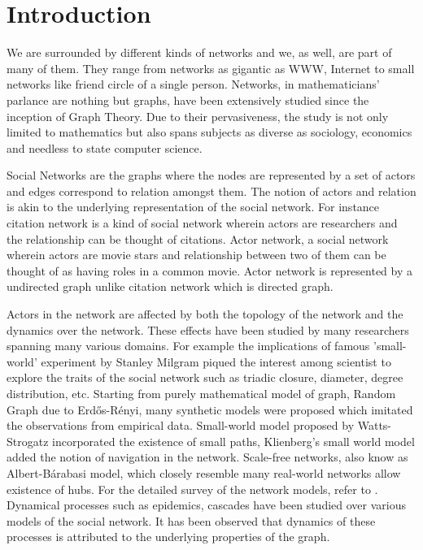 \documentclass[12pt]{article}
\begin{document}
\maketitle
\tableofcontents

\section{Introduction}
\par We are surrounded by different kinds of networks and we, as well, are part of many of them. They range from networks as gigantic as WWW, Internet to small networks like friend circle of a single person. Networks, in mathematicians' parlance are nothing but graphs, have been extensively studied since the inception of Graph Theory. Due to their pervasiveness, the study is not only limited to mathematics but also spans subjects as diverse as sociology, economics and needless to state computer science. \\

\par Social Networks are the graphs where the nodes are represented by a set of actors and edges correspond to relation amongst them. The notion of actors and relation is akin to the underlying representation of the social network. For instance citation network is a kind of social network wherein actors are researchers and the relationship can be thought of citations. Actor network, a social network wherein actors are movie stars and relationship between two of them can be thought of as having roles in a common movie. Actor network is represented by a undirected graph unlike citation network which is directed graph. \\

\par Actors in the network are affected by both the topology of the network and the dynamics over the network. These effects have been studied by many researchers spanning many various domains. For example the implications of famous 'small-world' experiment by Stanley Milgram\cite{milgram} piqued the interest among scientist to explore the traits of the social network such as triadic closure, diameter, degree distribution, etc. Starting from purely mathematical model of graph, Random Graph due to Erd\H{o}s-R\'enyi\cite{erdos}, many synthetic models were proposed which imitated the observations from empirical data. Small-world model\cite{watts} proposed by Watts-Strogatz incorporated the existence of small paths, Klienberg's small world model\cite{kleinberg} added the notion of navigation in the network. Scale-free networks, also know as Albert-B\'arabasi model\cite{barabasi}, which closely resemble many real-world networks allow existence of hubs. For the detailed survey of the network models, refer to \cite{newmann}. Dynamical processes such as epidemics, cascades have been studied over various models of the social network. It has been observed that dynamics of these processes is attributed to the underlying properties of the graph\cite{keeling}. \\
\end{document}
